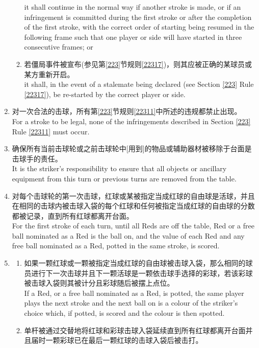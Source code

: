 \begin{enumerate}[label=(\alph*)]
\begin{enumerate}[label=(\roman*)]
        it shall continue in the normal way if another stroke is made, or if an infringement is committed during the first stroke or after the completion of the first stroke, with the correct order of starting being resumed in the following frame such that one player or side will have started in three consecutive frames; or
        \item \label{2233diii}若僵局事件被宣布(参见第\ref{223}节规则\ref{22317})，则其应被正确的某球员或某方重新开启。\\
        it shall, in the event of a stalemate being declared (see Section \ref{223} Rule \ref{22317}), be re-started by the correct player or side.
    \end{enumerate}
    \item 对一次合法的击球，所有第\ref{223}节规则\ref{22311}中所述的违规都禁止出现。\\
    For a stroke to be legal, none of the infringements described in Section \ref{223} Rule \ref{22311} must occur.
    \item 确保所有当前击球轮或之前击球轮中[用到]的物品或辅助器材被移除于台面是击球手的责任。\\
    It is the striker's responsibility to ensure that all objects or ancillary equipment from this turn or previous turns are removed from the table.
    \item 对每个击球轮的第一次击球，红球或某被指定当成红球的自由球是活球，并且在相同的击球内被击球入袋的每个红球和任何被指定当成红球的自由球的分数都被记录，直到所有红球都离开台面。\\
    For the first stroke of each turn, until all Reds are off the table, Red or a free ball nominated as a Red is the ball on, and the value of each Red and any free ball nominated as a Red, potted in the same stroke, is scored.
    \item \label{2233h}
    \begin{enumerate}[label=(\roman*)]
        \item 如果一颗红球或一颗被指定当成红球的自由球被击球入袋，那么相同的球员进行下一次击球并且下一颗活球是一颗依击球手选择的彩球，若该彩球被击球入袋则其被计分且彩球随后被摆上点位。\\
        If a Red, or a free ball nominated as a Red, is potted, the same player plays the next stroke and the next ball on is a colour of the striker's choice which, if potted, is scored and the colour is then spotted.
        \item 单杆被通过交替地将红球和彩球击球入袋延续直到所有红球都离开台面并且届时一颗彩球已在最后一颗红球的击球入袋后被击打。\\

\end{enumerate}
\end{enumerate}
